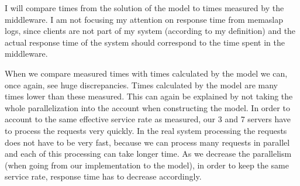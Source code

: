 \documentclass[11pt]{article}
\newcommand{\rowstyle}[1]{\gdef\currentrowstyle{#1}%
  #1\ignorespaces
}
\begin{document}
{\small
\begin{center}
\end{center}
}

I will compare times from the solution of the model to times measured by the middleware. I am not focusing my attention on response time from memaslap logs, since clients are not part of my system (according to my definition) and the actual response time of the system should correspond to the time spent in the middleware.

When we compare measured times with times calculated by the model we can, once again, see huge discrepancies. Times calculated by the model are many times lower than these measured. This can again be explained by not taking the whole parallelization into the account when constructing the model. In order to account to the same effective service rate as measured, our 3 and 7 servers have to process the requests very quickly. In the real system processing the requests does not have to be very fast, because we can process many requests in parallel and each of this processing can take longer time. As we decrease the parallelism (when going from our implementation to the model), in order to keep the same service rate, response time has to decrease accordingly.
\end{document}
